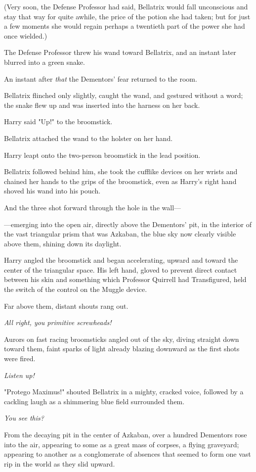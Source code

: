 (Very soon, the Defense Professor had said, Bellatrix would fall unconscious
and stay that way for quite awhile, the price of the potion she had taken; but
for just a few moments she would regain perhaps a twentieth part of the power
she had once wielded.)

The Defense Professor threw his wand toward Bellatrix, and an instant later
blurred into a green snake.

An instant after \emph{that} the Dementors' fear returned to the room.

Bellatrix flinched only slightly, caught the wand, and gestured without a word;
the snake flew up and was inserted into the harness on her back.

Harry said "Up!" to the broomstick.

Bellatrix attached the wand to the holster on her hand.

Harry leapt onto the two-person broomstick in the lead position.

Bellatrix followed behind him, she took the cufflike devices on her wrists and
chained her hands to the grips of the broomstick, even as Harry's right hand
shoved his wand into his pouch.

And the three shot forward through the hole in the wall---

---emerging into the open air, directly above the Dementors' pit, in the
interior of the vast triangular prism that was Azkaban, the blue sky now
clearly visible above them, shining down its daylight.

Harry angled the broomstick and began accelerating, upward and toward the
center of the triangular space. His left hand, gloved to prevent direct contact
between his skin and something which Professor Quirrell had Transfigured, held
the switch of the control on the Muggle device.

Far above them, distant shouts rang out.

\emph{All right, you primitive screwheads!}

Aurors on fast racing broomsticks angled out of the sky, diving straight down
toward them, faint sparks of light already blazing downward as the first shots
were fired.

\emph{Listen up!}

"Protego Maximus!" shouted Bellatrix in a mighty, cracked voice, followed by a
cackling laugh as a shimmering blue field surrounded them.

\emph{You see this?}

From the decaying pit in the center of Azkaban, over a hundred Dementors rose
into the air, appearing to some as a great mass of corpses, a flying graveyard;
appearing to another as a conglomerate of absences that seemed to form one vast
rip in the world as they slid upward.

